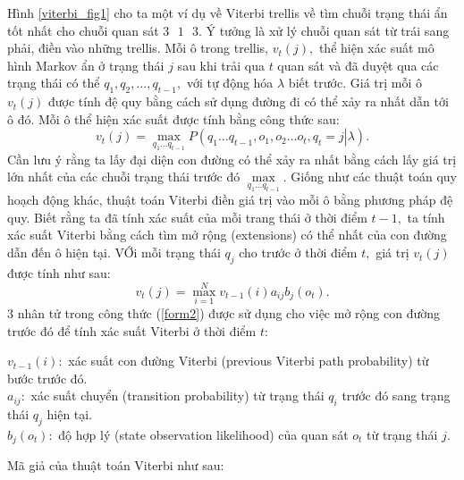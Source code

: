 Hình \ref{viterbi_fig1} cho ta một ví dụ về Viterbi trellis về tìm chuỗi trạng thái ẩn tốt nhất cho chuỗi quan sát $3 \text{ } 1 \text{ } 3.$ Ý tưởng là xử lý chuỗi quan sát từ trái sang phải, điền vào những trellis. Mỗi ô trong trellis, $v_t \left( j \right),$ thể hiện xác suất mô hình Markov ẩn ở trạng thái $j$ sau khi trải qua $t$ quan sát và đã duyệt qua các trạng thái có thể $q_1, q_2, ..., q_{t - 1},$ với tự động hóa $\lambda$ biết trước. Giá trị mỗi ô $v_t \left( j \right)$ được tính đệ quy bằng cách sử dụng đường đi có thể xảy ra nhất dẫn tới ô đó. Mỗi ô thể hiện xác suất được tính bằng công thức sau:
\begin{equation}
{v_t}\left( j \right) = \mathop {\max }\limits_{{q_1} \ldots {q_{t - 1}}} P\left( {\left. {{q_1} \ldots {q_{t - 1}},{o_1},{o_2} \ldots {o_t},{q_t} = j} \right|\lambda } \right).
\label{form1}
\end{equation}
Cần lưu ý rằng ta lấy đại diện con đường có thể xảy ra nhất bằng cách lấy giá trị lớn nhất của các chuỗi trạng thái trước đó $\mathop {\max }\limits_{{q_1} \ldots {q_{t - 1}}}.$ Giống như các thuật toán quy hoạch động khác, thuật toán Viterbi điền giá trị vào mỗi ô bằng phương pháp đệ quy. Biết rằng ta đã tính xác suất của mỗi trang thái ở thời điểm $t - 1,$ ta tính xác suất Viterbi bằng cách tìm mở rộng (extensions) có thể nhất của con đường dẫn đến ô hiện tại. VỚi mỗi trạng thái $q_j$ cho trước ở thời điểm $t,$ giá trị $v_t \left( j \right)$ được tính như sau:
\begin{equation}
{v_t}\left( j \right) = \mathop {\max }\limits_{i = 1}^N {v_{t - 1}}\left( i \right){a_{ij}}{b_j}\left( {{o_t}} \right).
\label{form2}
\end{equation}
3 nhân tử trong công thức (\ref{form2}) được sử dụng cho việc mở rộng con đường trước đó để tính xác suất Viterbi ở thời điểm $t:$
\begin{mybox}
$v_{t - 1} \left( i \right):$ xác suất con đường Viterbi (previous Viterbi path probability) từ bước trước đó.\\
$a_{ij}:$ xác suất chuyển (transition probability) từ trạng thái $q_i$ trước đó sang trạng thái $q_j$ hiện tại.\\
$b_j \left( {o_t} \right):$ độ hợp lý (state observation likelihood) của quan sát $o_t$ từ trạng thái $j.$
\end{mybox}
Mã giả của thuật toán Viterbi như sau:
